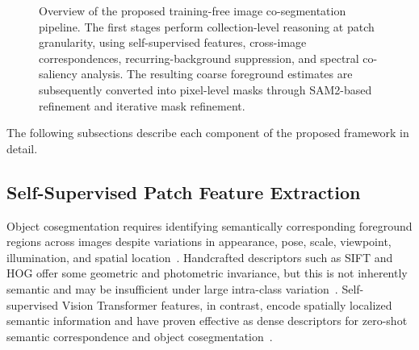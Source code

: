 \begin{figure}[t]
{%
}

\caption{
Overview of the proposed training-free image co-segmentation pipeline.
The first stages perform collection-level reasoning at patch granularity,
using self-supervised features, cross-image correspondences, recurring-background
suppression, and spectral co-saliency analysis.
The resulting coarse foreground estimates are subsequently converted into
pixel-level masks through SAM2-based refinement and iterative mask refinement.
}
\label{fig:pipeline}

\end{figure}

The following subsections describe each component of the proposed framework in detail.

\subsection{Self-Supervised Patch Feature Extraction}

Object cosegmentation requires identifying semantically corresponding
foreground regions across images despite variations in appearance, pose,
scale, viewpoint, illumination, and spatial
location~\cite{rubinstein2013unsupervised, bristow2015dense}. Handcrafted
descriptors such as SIFT and HOG offer some geometric and photometric
invariance, but this is not inherently semantic and may be insufficient
under large intra-class variation~\cite{bristow2015dense,
kim2017fcss}. Self-supervised Vision Transformer features, in contrast,
encode spatially localized semantic information and have proven
effective as dense descriptors for zero-shot semantic correspondence and
object cosegmentation~\cite{oquab2024dinov2,amir2023effectiveness}.

